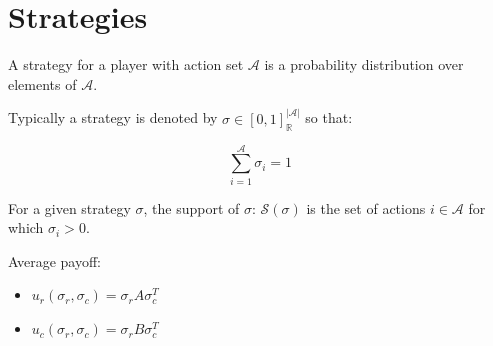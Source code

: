 \documentclass{beamer}              %
\begin{document}
\section{Strategies}

\begin{frame}
    \begin{definition}
        A strategy for a player with action set $\mathcal{A}$ is a probability
        distribution over elements of $\mathcal{A}$.
    
        Typically a strategy is denoted by $\sigma \in [0, 1]^{|\mathcal{A}|}_{\mathbb{R}}$ so that:
    
        $$\sum_{i=1}^{\mathcal{A}}\sigma_i = 1$$
    \end{definition}
\end{frame}


\begin{frame}
    \begin{definition}
        For a given strategy \(\sigma\), the support of \(\sigma\):
        \(\mathcal{S}(\sigma)\) is the set of actions \(i\in\mathcal{A}\) for
        which \(\sigma_i > 0\).
    \end{definition}
\end{frame}



\begin{frame}
    \begin{definition}
    Average payoff:
        \begin{itemize}
            \item \(u_{r}(\sigma_r, \sigma_c) = \sigma_r A \sigma_c^T\)
            \item \(u_{c}(\sigma_r, \sigma_c)  = \sigma_r B \sigma_c^T\)
        \end{itemize}
    \end{definition}
\end{frame}
\end{document}
